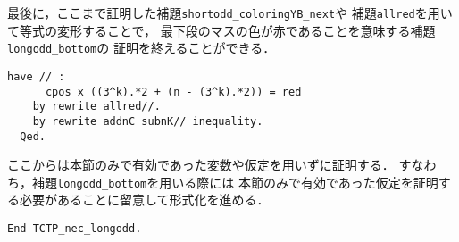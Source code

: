 最後に，ここまで証明した補題{\tt{shortodd\_coloringYB\_next}}や
補題{\tt{allred}}を用いて等式の変形することで，
最下段のマスの色が赤であることを意味する補題{\tt{longodd\_bottom}}の
証明を終えることができる．
\begin{lstlisting}[language=Coq]
    have // :
      cpos x ((3^k).*2 + (n - (3^k).*2)) = red
    by rewrite allred//.
    by rewrite addnC subnK// inequality.
  Qed.
\end{lstlisting}

ここからは本節のみで有効であった変数や仮定を用いずに証明する．
すなわち，補題{\tt{longodd\_bottom}}を用いる際には
本節のみで有効であった仮定を証明する必要があることに留意して形式化を進める．
\begin{lstlisting}[language=Coq]
  End TCTP_nec_longodd.
\end{lstlisting}

